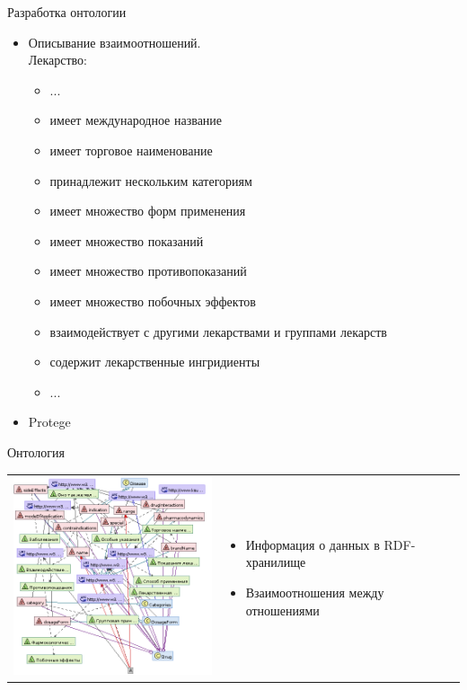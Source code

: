 \documentclass{beamer}
\begin{document}
\begin{frame}[t]{Разработка онтологии}
  \begin{itemize}
  \item Описывание взаимоотношений.
    \\Лекарство:
    \begin{itemize}
    \item ...
    \item имеет международное название
    \item имеет торговое наименование
    \item принадлежит нескольким категориям
    \item имеет множество форм применения
    \item имеет множество показаний
    \item имеет множество противопоказаний
    \item имеет множество побочных эффектов
    \item взаимодействует с другими лекарствами и группами лекарств
    \item содержит лекарственные ингридиенты
    \item ...
    \end{itemize}
  \item Protege
  \end{itemize}
\end{frame}
\begin{frame}[t]{Онтология}

\begin{tabular}{l l}
\begin{minipage}{0.6\textwidth}
\includegraphics[width=70mm]{onto.png}
\end{minipage}
&
\begin{minipage}{0.4\textwidth}
\begin{itemize}
\item Информация о данных в RDF-хранилище
\item Взаимоотношения между отношениями
\end{itemize}
\end{minipage}
\end{tabular}
\end{frame}
\end{document}
